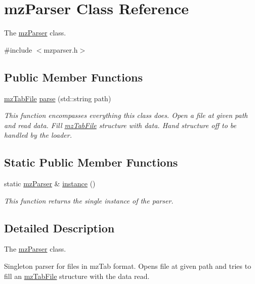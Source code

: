 \hypertarget{classmz_parser}{}\section{mz\+Parser Class Reference}
\label{classmz_parser}


The \mbox{\hyperlink{classmz_parser}{mz\+Parser}} class.  




{\ttfamily \#include $<$mzparser.\+h$>$}

\subsection*{Public Member Functions}
\begin{DoxyCompactItemize}
\item 
\mbox{\hyperlink{structmz_tab_file}{mz\+Tab\+File}} \mbox{\hyperlink{classmz_parser_aaff07e834a579526b82e86a7bd026d1f}{parse}} (std\+::string path)
\begin{DoxyCompactList}\small\item\em This function encompasses everything this class does. Open a file at given path and read data. Fill \mbox{\hyperlink{structmz_tab_file}{mz\+Tab\+File}} structure with data. Hand structure off to be handled by the loader. \end{DoxyCompactList}\end{DoxyCompactItemize}
\subsection*{Static Public Member Functions}
\begin{DoxyCompactItemize}
\item 
static \mbox{\hyperlink{classmz_parser}{mz\+Parser}} \& \mbox{\hyperlink{classmz_parser_a8838850b084cdc867b2b03122de5401b}{instance}} ()
\begin{DoxyCompactList}\small\item\em This function returns the single instance of the parser. \end{DoxyCompactList}\end{DoxyCompactItemize}


\subsection{Detailed Description}
The \mbox{\hyperlink{classmz_parser}{mz\+Parser}} class. 

Singleton parser for files in mz\+Tab format. Opens file at given path and tries to fill an \mbox{\hyperlink{structmz_tab_file}{mz\+Tab\+File}} structure with the data read. 

